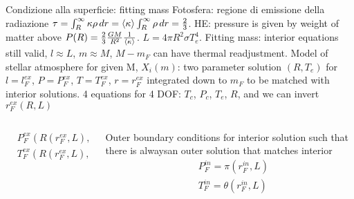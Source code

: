 \begin{frame}{Condizione alla superficie: fitting mass}
Fotosfera: regione di emissione della radiazione $\tau=\int_R^{\infty}\kappa\rho\,dr=\langle \kappa \rangle\int_R^{\infty}\rho\,dr=\frac{2}{3}$. HE: pressure is given by weight of matter above $P(R)=\frac{2}{3}\frac{GM}{R^2}\frac{1}{\langle \kappa \rangle}$. $L=4\pi R^2\sigma T_e^4$.
Fitting mass: interior equations still valid, $l\approx L$, $m\approx M$, $M-m_F$ can have thermal readjustment.
Model of stellar atmosphere for given M, $X_i(m)$: two parameter solution $(R,T_e)$ for $l=l_F^{ex}$, $P=P_F^{ex}$, $T=T_F^{ex}$, $r=r_F^{ex}$ integrated down to $m_F$ to be matched with interior solutions.
4 equations for 4 DOF: $T_c$, $P_c$, $T_e$, $R$, and we can invert $r_F^{ex}(R,L)$
\begin{columns}[T]
\begin{column}{0.5\textwidth}
\begin{align*}
&P_F^{ex}(R(r_F^{ex},L),L)=\pi(r_F^{ex},L)\\
&T_F^{ex}(R(r_F^{ex},L),L)=\theta(r_F^{ex},L)
\end{align*}
\end{column}
\begin{column}{0.5\textwidth}
	Outer boundary conditions for interior solution such that there is alwaysan outer solution that matches interior
\begin{align*}
&P_F^{in}=\pi(r_F^{in},L)\\
&T_F^{in}=\theta(r_F^{in},L)
\end{align*}
\end{column}
\end{columns}

\end{frame}

